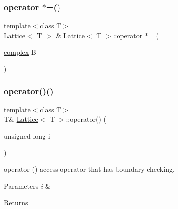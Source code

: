 \mbox{\label{class_lattice_ae4405517258f14d94479ad6f2c2f4343}} 
\subsubsection{\texorpdfstring{operator $\ast$=()}{operator *=()}\hspace{0.1cm}{\footnotesize\ttfamily [4/4]}}
{\footnotesize\ttfamily template$<$class T$>$ \\
\mbox{\hyperlink{class_lattice}{Lattice}}$<$ T $>$ \& \mbox{\hyperlink{class_lattice}{Lattice}}$<$ T $>$\+::operator $\ast$= (\begin{DoxyParamCaption}\item[{\mbox{\hyperlink{classcomplex}{complex}}}]{B }\end{DoxyParamCaption})\hspace{0.3cm}{\ttfamily [inline]}}

\mbox{\label{class_lattice_ae588d401adbaab9889698b3e9c6e00b1}} 
\subsubsection{\texorpdfstring{operator()()}{operator()()}}
{\footnotesize\ttfamily template$<$class T$>$ \\
T\& \mbox{\hyperlink{class_lattice}{Lattice}}$<$ T $>$\+::operator() (\begin{DoxyParamCaption}\item[{unsigned long}]{i }\end{DoxyParamCaption})\hspace{0.3cm}{\ttfamily [inline]}}



operator () access operator that has boundary checking. 


\begin{DoxyParams}{Parameters}
{\em i} & \\
\hline
\end{DoxyParams}
\begin{DoxyReturn}{Returns}

\end{DoxyReturn}
\mbox{\label{class_lattice_aa5eb9113987a4a411cd57245d591a458}} 
